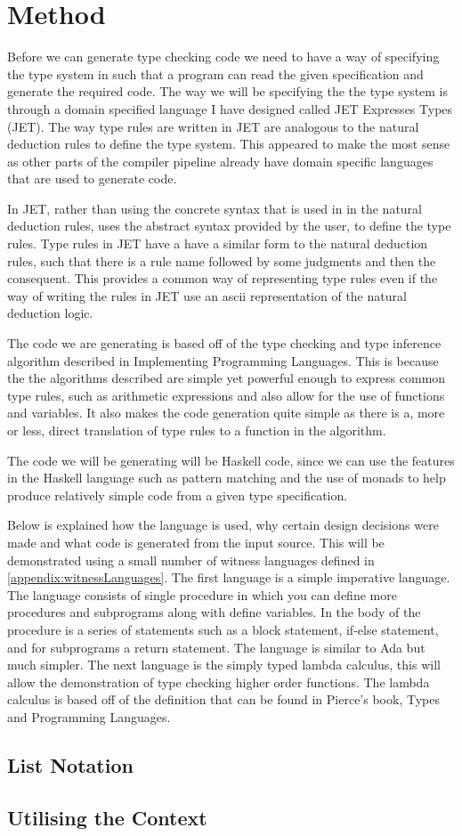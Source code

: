 \chapter{Method}
Before we can generate type checking code we need to have a way of specifying the type system in such that a program can read the given specification and generate the required code.
The way we will be specifying the the type system is through a domain specified language I have designed called JET Expresses Types (JET).
The way type rules are written in JET are analogous to the natural deduction rules to define the type system.
This appeared to make the most sense as other parts of the compiler pipeline already have domain specific languages that are used to generate code.

In JET, rather than using the concrete syntax that is used in in the natural deduction rules, uses the abstract syntax provided by the user, to define the type rules.
Type rules in JET have a have a similar form to the natural deduction rules, such that there is a rule name followed by some judgments and then the consequent.
This provides a common way of representing type rules even if the way of writing the rules in JET use an ascii representation of the natural deduction logic.

The code we are generating is based off of the type checking and type inference algorithm described in Implementing Programming Languages\cite{ranta2012implementing}.
This is because the the algorithms described are simple yet powerful enough to express common type rules, such as arithmetic expressions and also allow for the use of functions and variables.
It also makes the code generation quite simple as there is a, more or less, direct translation of type rules to a function in the algorithm.

The code we will be generating will be Haskell code, since we can use the features in the Haskell language such as pattern matching and the use of monads to help produce relatively simple code from a given type specification.

Below is explained how the language is used, why certain design decisions were made and what code is generated from the input source. 
This will be demonstrated using a small number of  witness languages defined in \autoref{appendix:witnessLanguages}.
The first language is a simple imperative language. 
The language consists of single procedure in which you can define more procedures and subprograms along with define variables. In the body of the procedure is a series of statements such as a block statement, if-else statement, and for subprograms a return statement. The language is similar to Ada but much simpler.
The next language is the simply typed lambda calculus, this will allow the demonstration of type checking higher order functions.
The lambda calculus is based off of the definition that can be found in Pierce's book, Types and Programming Languages\cite{pierce2002types}.




\section{List Notation}
\section{Utilising the Context}